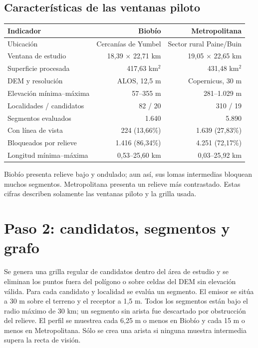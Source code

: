 \documentclass[11pt,a4paper]{article}
\begin{document}
\subsection{Características de las ventanas piloto}
\begin{center}\small\begin{tabular}{@{}lrr@{}}\toprule
\textbf{Indicador}&\textbf{Biobío}&\textbf{Metropolitana}\\\midrule
Ubicación&Cercanías de Yumbel&Sector rural Paine/Buin\\
Ventana de estudio&18,39 $\times$ 22,71 km&19,05 $\times$ 22,65 km\\
Superficie procesada&417,63 km$^2$&431,48 km$^2$\\
DEM y resolución&ALOS, 12,5 m&Copernicus, 30 m\\
Elevación mínima--máxima&57--355 m&281--1.029 m\\
Localidades / candidatos&82 / 20&310 / 19\\
Segmentos evaluados&1.640&5.890\\
Con línea de vista&224 (13,66\%)&1.639 (27,83\%)\\
Bloqueados por relieve&1.416 (86,34\%)&4.251 (72,17\%)\\
Longitud mínima--máxima&0,53--25,60 km&0,03--25,92 km\\\bottomrule\end{tabular}\end{center}
Biobío presenta relieve bajo y ondulado; aun así, sus lomas intermedias bloquean muchos segmentos. Metropolitana presenta un relieve más contrastado. Estas cifras describen solamente las ventanas piloto y la grilla usada.

\section{Paso 2: candidatos, segmentos y grafo}
Se genera una grilla regular de candidatos dentro del área de estudio y se eliminan los puntos fuera del polígono o sobre celdas del DEM sin elevación válida. Para cada candidato y localidad se evalúa un segmento. El emisor se sitúa a 30 m sobre el terreno y el receptor a 1,5 m. Todos los segmentos están bajo el radio máximo de 30 km; un segmento sin arista fue descartado por obstrucción del relieve. El perfil se muestrea cada 6,25 m o menos en Biobío y cada 15 m o menos en Metropolitana. Sólo se crea una arista si ninguna muestra intermedia supera la recta de visión.
\end{document}

